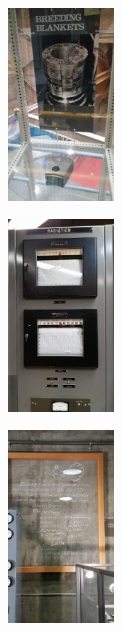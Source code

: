 \documentclass[aspectratio=1610,pdftex,dvipsnames,compress,xcolor={dvipsnames}]{beamer}
\begin{document}
\begin{frame}{}
    \begin{figure}
        \centering
        \includegraphics[width=0.25\textwidth]{ebr4.jpg}
    \end{figure}
\end{frame}


\begin{frame}{}
    \begin{figure}
        \centering
        \includegraphics[width=0.25\textwidth]{ebr5.jpg}
    \end{figure}
\end{frame}


\begin{frame}{}
    \begin{figure}
        \centering
        \includegraphics[width=0.25\textwidth]{ebr6.jpg}
    \end{figure}
\end{frame}
\end{document}
